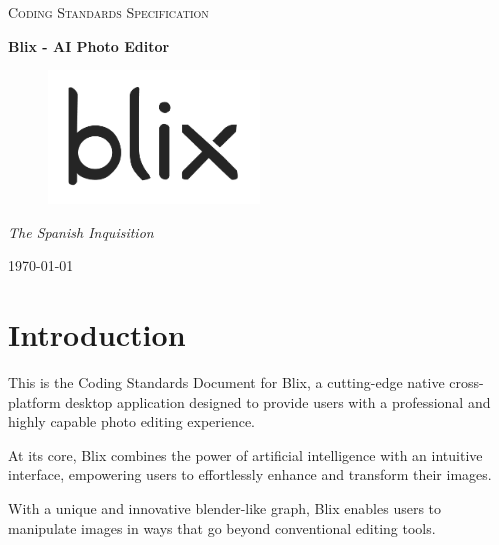 \documentclass[11pt,a4paper]{article}
\begin{document}
\begin{titlepage}
	\centering
    {\scshape\LARGE Coding Standards Specification\par}
    \vspace{1.5cm}
    {\huge\bfseries Blix - AI Photo Editor\par}
    \vspace{2.5cm}
    \begin{figure}[h]
        \centering %
        \includegraphics[width=0.5\textwidth]{../pics/blix.png}
    \end{figure}
    \vspace{2.5cm}
    {\Large\itshape The Spanish Inquisition\par}

    \vfill
    {\large \today\par}
\end{titlepage}

\tableofcontents
\pagebreak


\section*{Introduction}

This is the Coding Standards Document for Blix, a cutting-edge native cross-platform desktop application designed to provide users with
a professional and highly capable photo editing experience. 

At its core, Blix combines the power of artificial intelligence with an intuitive interface, empowering users to effortlessly enhance and transform 
their images. 

With a unique and innovative blender-like graph,
Blix enables users to manipulate images in ways that go beyond conventional editing tools.
\end{document}
